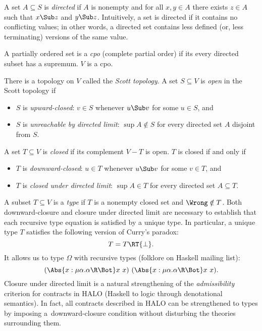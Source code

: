 \documentclass{amsart}
\begin{document}
A set $A\subseteq S$ is \emph{directed} if $A$ is nonempty and
for all $x,y\in A$ there exists $z\in A$ such that $x\Sub z$ and
$y\Sub z$. Intuitively, a set is directed if it contains no
conflicting values; in other words, a directed set contains less
defined (or, less terminating) versions of the same value.

A partially ordered set is a \emph{cpo} (complete partial order)
if its every directed subset has a supremum. $V$ is a cpo.

\begin{samepage}
There is a topology on $V$ called the \emph{Scott topology}.
A set $S\subseteq V$ is \emph{open} in the Scott topology if
\begin{itemize}
\item $S$ is \emph{upward-closed}: $v\in S$ whenever $u\Sub v$
for some $u\in S$, and
\item $S$ is \emph{unreachable by directed limit}: $\sup A\notin
S$ for every directed set $A$ disjoint from $S$.
\end{itemize}
\end{samepage}

\begin{samepage}
A set $T\subseteq V$ is \emph{closed} if its complement $V-T$ is
open. $T$ is closed if and only if
\begin{itemize}
\item $T$ is \emph{downward-closed}: $u\in T$ whenever $u\Sub v$
for some $v\in T$, and
\item $T$ is \emph{closed under directed limit}: $\sup A\in T$
for every directed set $A\subseteq T$.
\end{itemize}
\end{samepage}

A subset $T\subseteq V$ is a \emph{type} if $T$ is a nonempty
closed set and $\Wrong\notin T$. Both downward-closure and
closure under directed limit are necessary to establish that each
recursive type equation is satisfied by a unique type. In
particular, a unique type $T$ satisfies the following version of
Curry's paradox:
\[
T=T\RT \{\bot\}.
\]
It allows us to type $\Omega$ with recursive types (folklore on
Haskell mailing list):
\[
(\Abs{x : \mu\alpha. \alpha\R\Bot}x~x)~
(\Abs{x : \mu\alpha. \alpha\R\Bot}x~x).
\]
Closure under directed limit is a natural strengthening of the
\emph{admissibility} criterion for contracts in HALO (Haskell to
logic through denotational semantics). In fact, all contracts
described in HALO can be strengthened to types by imposing
a~downward-closure condition without disturbing the theories
surrounding them.
\end{document}
